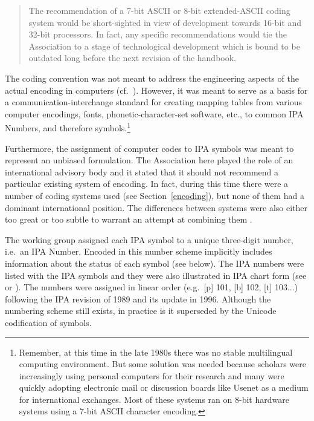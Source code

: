 \begin{quote}
The recommendation of a 7-bit ASCII or 8-bit extended-ASCII coding system 
would be short-sighted in view of development towards 16-bit and 32-bit 
processors. In fact, any specific recommendations would tie the Association 
to a stage of technological development which is bound to be outdated long 
before the next revision of the handbook.
\end{quote}

\noindent The coding convention was not meant to address the engineering 
aspects of the actual encoding in computers (cf.\ \cite{Anderson1984}). However, 
it was meant to serve as a basis for a communication-interchange standard for 
creating mapping tables from various computer encodings, fonts, phonetic-character-set 
software, etc., to common IPA Numbers, and therefore symbols.\footnote{Remember, at 
this time in the late 1980s there was no stable multilingual computing environment. 
But some solution was needed because scholars were increasingly using personal 
computers for their research and many were quickly adopting electronic mail or 
discussion boards like Usenet as a medium for international exchanges. 
Most of these systems ran on 8-bit hardware systems using a 7-bit ASCII character encoding.}

Furthermore, the assignment of computer codes to IPA symbols was meant to
represent an unbiased formulation. The Association here played the role of an
international advisory body and it stated that it should not recommend a
particular existing system of encoding. In fact, during this time there were a
number of coding systems used (see Section~\ref{encoding}), but none of them had
a dominant international position. The differences between systems were also
either too great or too subtle to warrant an attempt at combining them
\citep{International1989report}.

The working group assigned each IPA symbol to a unique three-digit number, i.e.\
an IPA Number. Encoded in this number scheme implicitly includes information
about the status of each symbol (see below). The IPA numbers were listed with the
IPA symbols and they were also illustrated in IPA chart form (see
\cite[84]{EslingGaylord1993} or \cite[App. 2]{IPA1999}). The numbers were
assigned in linear order (e.g.\ [p] 101, [b] 102, [t] 103...) following the IPA
revision of 1989 and its update in 1996. Although the numbering scheme still 
exists, in practice is it superseded by the Unicode codification of symbols.


